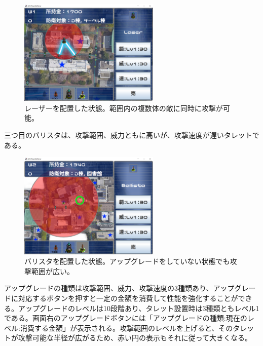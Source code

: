 \documentclass[11pt,a4j]{jarticle}
\begin{document}
\begin{figure}[H]
    \begin{center}
        \leavevmode
        \includegraphics[width=0.6\textwidth]{laser.png}
        \caption{レーザーを配置した状態。範囲内の複数体の敵に同時に攻撃が可能。}
        \label{fig:laser}
    \end{center}
\end{figure}

三つ目のバリスタは、攻撃範囲、威力ともに高いが、攻撃速度が遅いタレットである。

\begin{figure}[H]
    \begin{center}
        \leavevmode
        \includegraphics[width=0.6\textwidth]{ballista.png}
        \caption{バリスタを配置した状態。アップグレードをしていない状態でも攻撃範囲が広い。}
        \label{fig:ballista}
    \end{center}
\end{figure}

アップグレードの種類は攻撃範囲、威力、攻撃速度の3種類あり、アップグレードに対応するボタンを押すと一定の金額を消費して性能を強化することができる。アップグレードのレベルは10段階あり、タレット設置時は3種類ともレベル1である。画面右のアップグレードボタンには「アップグレードの種類:現在のレベル:消費する金額」が表示される。攻撃範囲のレベルを上げると、そのタレットが攻撃可能な半径が広がるため、赤い円の表示もそれに従って大きくなる。
\end{document}
